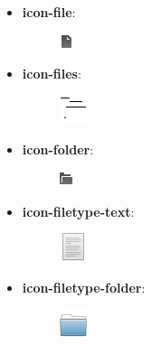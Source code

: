 \documentclass[letterpaper,10pt,english]{sphinxmanual}
\begin{document}
\begin{itemize}
\begin{description}
\end{description}

\item {} \begin{description}
\item[{\textbf{icon-file}:}] \leavevmode
\includegraphics{file.png}

\end{description}

\item {} \begin{description}
\item[{\textbf{icon-files}:}] \leavevmode
\includegraphics{files.png}

\end{description}

\item {} \begin{description}
\item[{\textbf{icon-folder}:}] \leavevmode
\includegraphics{folder.png}

\end{description}

\item {} \begin{description}
\item[{\textbf{icon-filetype-text}:}] \leavevmode
\includegraphics{text.png}

\end{description}

\item {} \begin{description}
\item[{\textbf{icon-filetype-folder}:}] \leavevmode
\includegraphics{folder1.png}

\end{description}


\end{itemize}
\end{document}
